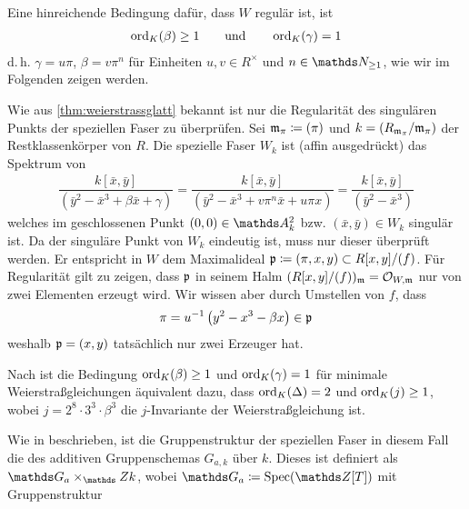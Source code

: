 \documentclass[german, bibliography=totoc]{scrreprt}
\begin{document}
\begin{Bemerkung}%
  \label{bem:bedregweierstraßmodell}
  Eine hinreichende Bedingung dafür, dass $W$ regulär ist, ist
  \begin{gather*}
    \operatorname{ord}_{K}(\beta)\geq 1
    \qquad\text{und}\qquad
    \operatorname{ord}_{K}(\gamma)=1
  \end{gather*}
  d.\,h. $\gamma=u\pi$, $\beta=v\pi^n$ für Einheiten $u,v\in R^\times$
  und $n\in\N_{\geq1}$, wie wir im Folgenden zeigen werden.
  
  Wie aus \ref{thm:weierstrassglatt} bekannt ist nur die
  Regularität des singulären Punkts der speziellen Faser zu
  überprüfen.
  Sei $\mathfrak{m}_\pi\coloneqq(\pi)$ und $k=(R_{\mathfrak{m}_\pi}/\mathfrak{m}_\pi)$ der
  Restklassenkörper von $R$.
  Die spezielle Faser $W_k$ ist (affin ausgedrückt) das Spektrum von
  \begin{gather*}
    \dfrac{k[\bar x,\bar y]}{(\bar y^2-\bar x^3+\beta \bar x+\gamma)}
    =\dfrac{k[\bar x,\bar y]}{(\bar y^2-\bar x^3+v\pi^n \bar x+u\pi x)}
    =\dfrac{k[\bar x,\bar y]}{(\bar y^2-\bar x^3)}
  \end{gather*}
  welches im geschlossenen Punkt $(0,0)\in\A_k^2$ bzw.
  $(\bar x,\bar y)\in W_k$ singulär ist. Da der singuläre Punkt von
  $W_k$ eindeutig ist, muss nur dieser überprüft werden.
  Er entspricht in $W$ dem Maximalideal
  $\mathfrak{p}\coloneqq(\pi,x,y)\subset R[x,y]/(f)$.
  Für Regularität gilt zu zeigen, dass $\mathfrak{p}$ in seinem Halm
  $(R[x,y]/(f))_{\mathfrak{m}}=\mathcal{O}_{W,\mathfrak{m}}$ nur von zwei Elementen erzeugt wird.
  Wir wissen aber durch Umstellen von $f$, dass
  \begin{gather*}
    \pi = u^{-1}\left( y^2-x^3-\beta x \right)\in\mathfrak{p}
  \end{gather*}
  weshalb $\mathfrak{p}=(x,y)$ tatsächlich nur zwei Erzeuger hat.

  Nach \cite[Chapter 1.5, Lemma 3 and Lemma 4]{neron} ist die
  Bedingung $\operatorname{ord}_{K}(\beta)\geq 1$ und $\operatorname{ord}_{K}(\gamma)=1$ für
  minimale Weierstraßgleichungen äquivalent dazu,
  dass $\operatorname{ord}_{K}(\Delta)=2$ und $\operatorname{ord}_{K}(j)\geq 1$,
  wobei $j=2^8\cdot 3^3\cdot\beta^3$ die $j$-Invariante der
  Weierstraßgleichung ist.

  Wie in \cite[Chapter 1.5]{neron} beschrieben, ist die
  Gruppenstruktur der speziellen Faser in diesem Fall die des
  additiven Gruppenschemas $G_{a,k}$ über $k$. Dieses ist definiert
  als $\G_{a}\times_\Z k$, wobei $\G_{a}\coloneqq\Spec(\Z[T])$ mit
  Gruppenstruktur
  \begin{center}
  \end{center}
\end{Bemerkung}
\end{document}
